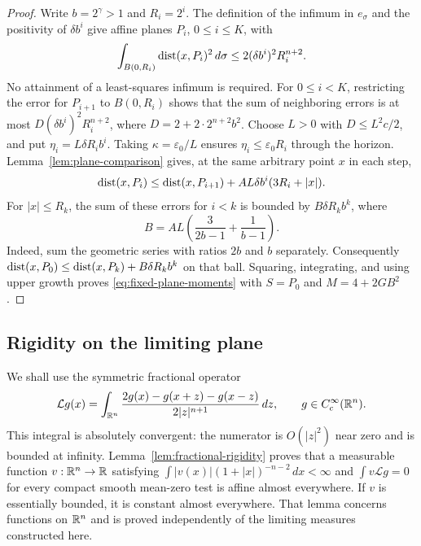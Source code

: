 \begin{proof}
Write $b=2^\gamma>1$ and $R_i=2^i$.  The definition of the infimum in
$e_\sigma$ and the positivity of $\delta b^i$ give affine planes $P_i$,
$0\le i\le K$, with
\[
 \int_{B(0,R_i)}\operatorname{dist}(x,P_i)^2\,d\sigma
 \le2(\delta b^i)^2R_i^{n+2}.
\]
No attainment of a least-squares infimum is required.  For $0\le i<K$,
restricting the error for $P_{i+1}$ to $B(0,R_i)$ shows that the sum of neighboring errors
is at most
$D(\delta b^i)^2R_i^{n+2}$, where
$D=2+2\cdot2^{n+2}b^2$.
Choose $L>0$ with $D\le L^2c/2$, and put
$\eta_i=L\delta R_i b^i$.  Taking
$\kappa=\varepsilon_0/L$ ensures $\eta_i\le\varepsilon_0R_i$ through
the horizon.  Lemma~\ref{lem:plane-comparison} gives, at the same arbitrary
point $x$ in each step,
\[
 \operatorname{dist}(x,P_i)\le\operatorname{dist}(x,P_{i+1})
       +AL\delta b^i(3R_i+|x|).
\]
For $|x|\le R_k$, the sum of these errors for $i<k$ is bounded by
$B\delta R_kb^k$, where
\[
 B=AL\left(\frac3{2b-1}+\frac1{b-1}\right).
\]
Indeed, sum the geometric series with ratios $2b$ and $b$ separately.
Consequently
$\operatorname{dist}(x,P_0)\le\operatorname{dist}(x,P_k)+B\delta R_kb^k$ on that ball.
Squaring, integrating, and using upper growth proves
\eqref{eq:fixed-plane-moments} with $S=P_0$ and $M=4+2GB^2$.
\end{proof}

\subsection{Rigidity on the limiting plane}

We shall use the symmetric fractional operator
\begin{equation}\label{eq:fractional-operator-definition}
 \mathcal Lg(x)=\int_{\mathbb R^n}
 \frac{2g(x)-g(x+z)-g(x-z)}{2|z|^{n+1}}\,dz,
 \qquad g\in C_c^\infty(\mathbb R^n).
\end{equation}
This integral is absolutely convergent: the numerator is $O(|z|^2)$ near
zero and is bounded at infinity. Lemma~\ref{lem:fractional-rigidity}
proves that a measurable function $v:\mathbb R^n\to\mathbb R$ satisfying
$\int|v(x)|(1+|x|)^{-n-2}\,dx<\infty$ and
$\int v\mathcal Lg=0$ for every compact smooth mean-zero test is affine
almost everywhere. If $v$ is essentially bounded, it is constant
almost everywhere.
That lemma concerns functions on $\mathbb R^n$ and is proved independently
of the limiting measures constructed here.

